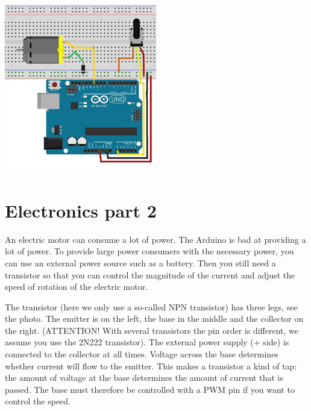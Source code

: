 \documentclass{arduino}
\begin{document}
\begin{center}
\includegraphics[width=0.8\linewidth]{29. Circuit motor control}
\end{center}

\newpage

\section{Electronics part 2}




An electric motor can consume a lot of power. The Arduino is bad at providing a lot of power. To provide large power consumers with the necessary power, you can use an external power source such as a battery. Then you still need a transistor so that you can control the magnitude of the current and adjust the speed of rotation of the electric motor.

The transistor (here we only use a so-called NPN transistor) has three legs, see the photo. The emitter is on the left, the base in the middle and the collector on the right. (ATTENTION! With several transistors the pin order is different, we assume you use the 2N222 transistor). The external power supply (+ side) is connected to the collector at all times. Voltage across the base determines whether current will flow to the emitter. This makes a transistor a kind of tap: the amount of voltage at the base determines the amount of current that is passed. The base must therefore be controlled with a PWM pin if you want to control the speed.
\end{document}
